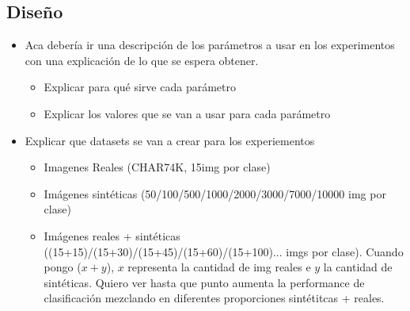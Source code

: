 \subsection{Diseño}
	\begin{itemize}
		\item Aca debería ir una descripción de los parámetros a usar en los experimentos con una explicación de lo que se espera obtener.
		\begin{itemize}
			\item Explicar para qué sirve cada parámetro
			\item Explicar los valores que se van a usar para cada parámetro
		\end{itemize}
		\item Explicar que datasets se van a crear para los experiementos
		\begin{itemize}
			\item Imagenes Reales (CHAR74K, 15img por clase)
			\item Imágenes sintéticas (50/100/500/1000/2000/3000/7000/10000 img por clase)
			\item Imágenes reales + sintéticas ((15+15)/(15+30)/(15+45)/(15+60)/(15+100)... imgs por clase). Cuando pongo ($x+y$), $x$ representa la cantidad de img reales e $y$ la cantidad de sintéticas. Quiero ver hasta que punto aumenta la performance de clasificación mezclando en diferentes proporciones sintétitcas + reales.
		\end{itemize}
	\end{itemize}
